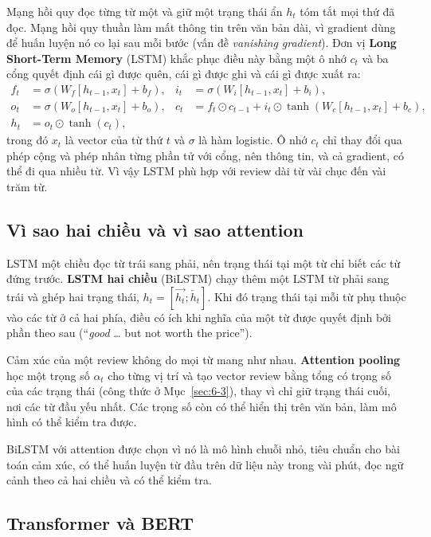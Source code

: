 Mạng hồi quy đọc từng từ một và giữ một trạng thái ẩn $h_t$ tóm tắt mọi thứ đã đọc. Mạng hồi quy thuần làm mất thông tin trên văn bản dài, vì gradient dùng để huấn luyện nó co lại sau mỗi bước (vấn đề \emph{vanishing gradient}). Đơn vị \textbf{Long Short-Term Memory} (LSTM) khắc phục điều này bằng một ô nhớ $c_t$ và ba cổng quyết định cái gì được quên, cái gì được ghi và cái gì được xuất ra:
\begin{align*}
    f_t &= \sigma(W_f[h_{t-1},x_t]+b_f), & i_t &= \sigma(W_i[h_{t-1},x_t]+b_i),\\
    o_t &= \sigma(W_o[h_{t-1},x_t]+b_o), & c_t &= f_t\odot c_{t-1} + i_t\odot\tanh(W_c[h_{t-1},x_t]+b_c),\\
    h_t &= o_t\odot\tanh(c_t), & &
\end{align*}
trong đó $x_t$ là vector của từ thứ $t$ và $\sigma$ là hàm logistic. Ô nhớ $c_t$ chỉ thay đổi qua phép cộng và phép nhân từng phần tử với cổng, nên thông tin, và cả gradient, có thể đi qua nhiều từ. Vì vậy LSTM phù hợp với review dài từ vài chục đến vài trăm từ.

\subsection*{Vì sao hai chiều và vì sao attention}

LSTM một chiều đọc từ trái sang phải, nên trạng thái tại một từ chỉ biết các từ đứng trước. \textbf{LSTM hai chiều} (BiLSTM) chạy thêm một LSTM từ phải sang trái và ghép hai trạng thái, $h_t=[\overrightarrow{h_t};\overleftarrow{h_t}]$. Khi đó trạng thái tại mỗi từ phụ thuộc vào các từ ở cả hai phía, điều có ích khi nghĩa của một từ được quyết định bởi phần theo sau (``\emph{good} \ldots{} but not worth the price'').

Cảm xúc của một review không do mọi từ mang như nhau. \textbf{Attention pooling} học một trọng số $\alpha_t$ cho từng vị trí và tạo vector review bằng tổng có trọng số của các trạng thái (công thức ở Mục~\ref{sec:6-3}), thay vì chỉ giữ trạng thái cuối, nơi các từ đầu yếu nhất. Các trọng số còn có thể hiển thị trên văn bản, làm mô hình có thể kiểm tra được.

BiLSTM với attention được chọn vì nó là mô hình chuỗi nhỏ, tiêu chuẩn cho bài toán cảm xúc, có thể huấn luyện từ đầu trên dữ liệu này trong vài phút, đọc ngữ cảnh theo cả hai chiều và có thể kiểm tra.

\subsection*{Transformer và BERT}

